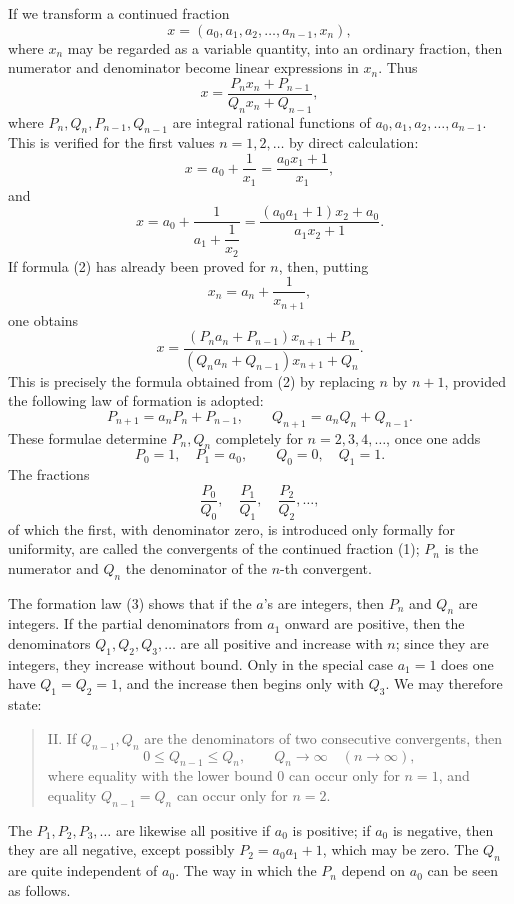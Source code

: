 \documentclass[11pt]{article}
\begin{document}
If we transform a continued fraction
\[
\tag{1}        x=(a_0,a_1,a_2,\ldots,a_{n-1},x_n),
\]
where $x_n$ may be regarded as a variable quantity, into an ordinary fraction, then numerator and denominator become linear expressions in $x_n$. Thus
\[
\tag{2}        x=\frac{P_nx_n+P_{n-1}}{Q_nx_n+Q_{n-1}},
\]
where $P_n,Q_n,P_{n-1},Q_{n-1}$ are integral rational functions of $a_0,a_1,a_2,\ldots,a_{n-1}$. This is verified for the first values $n=1,2,\ldots$ by direct calculation:
\[
 x=a_0+\frac1{x_1}=\frac{a_0x_1+1}{x_1},
\]
and
\[
 x=a_0+\frac1{a_1+\dfrac1{x_2}}
  =\frac{(a_0a_1+1)x_2+a_0}{a_1x_2+1}.
\]
If formula (2) has already been proved for $n$, then, putting
\[
        x_n=a_n+\frac1{x_{n+1}},
\]
one obtains
\[
 x=\frac{(P_na_n+P_{n-1})x_{n+1}+P_n}
        {(Q_na_n+Q_{n-1})x_{n+1}+Q_n}.
\]
This is precisely the formula obtained from (2) by replacing $n$ by $n+1$, provided the following law of formation is adopted:
\[
\tag{3}        P_{n+1}=a_nP_n+P_{n-1},\qquad
               Q_{n+1}=a_nQ_n+Q_{n-1}.
\]
These formulae determine $P_n,Q_n$ completely for $n=2,3,4,\ldots$, once one adds
\[
\tag{4}        P_0=1,\quad P_1=a_0,\qquad
               Q_0=0,\quad Q_1=1.
\]
The fractions
\[
        \frac{P_0}{Q_0},\quad \frac{P_1}{Q_1},\quad \frac{P_2}{Q_2},\ldots,
\]
of which the first, with denominator zero, is introduced only formally for uniformity, are called the convergents of the continued fraction (1); $P_n$ is the numerator and $Q_n$ the denominator of the $n$-th convergent.

The formation law (3) shows that if the $a$'s are integers, then $P_n$ and $Q_n$ are integers. If the partial denominators from $a_1$ onward are positive, then the denominators $Q_1,Q_2,Q_3,\ldots$ are all positive and increase with $n$; since they are integers, they increase without bound. Only in the special case $a_1=1$ does one have $Q_1=Q_2=1$, and the increase then begins only with $Q_3$. We may therefore state:

\begin{quote}
II. If $Q_{n-1},Q_n$ are the denominators of two consecutive convergents, then
\[
        0\le Q_{n-1}\le Q_n,
        \qquad
        Q_n\to\infty\quad(n\to\infty),
\]
where equality with the lower bound $0$ can occur only for $n=1$, and equality $Q_{n-1}=Q_n$ can occur only for $n=2$.
\end{quote}

The $P_1,P_2,P_3,\ldots$ are likewise all positive if $a_0$ is positive; if $a_0$ is negative, then they are all negative, except possibly $P_2=a_0a_1+1$, which may be zero. The $Q_n$ are quite independent of $a_0$. The way in which the $P_n$ depend on $a_0$ can be seen as follows.
\end{document}
